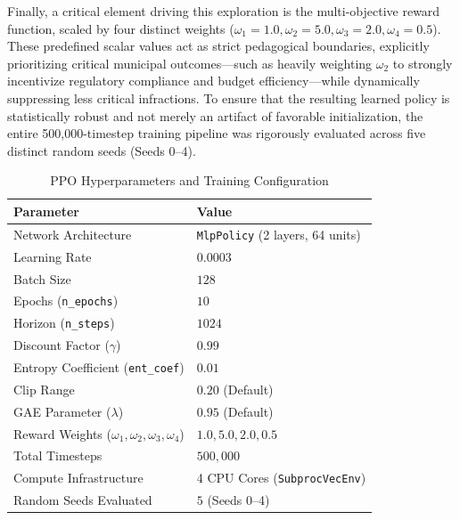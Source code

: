 Finally, a critical element driving this exploration is the multi-objective reward function, scaled by four distinct weights ($\omega_1 = 1.0, \omega_2 = 5.0, \omega_3 = 2.0, \omega_4 = 0.5$). These predefined scalar values act as strict pedagogical boundaries, explicitly prioritizing critical municipal outcomes—such as heavily weighting $\omega_2$ to strongly incentivize regulatory compliance and budget efficiency—while dynamically suppressing less critical infractions. To ensure that the resulting learned policy is statistically robust and not merely an artifact of favorable initialization, the entire 500,000-timestep training pipeline was rigorously evaluated across five distinct random seeds (Seeds 0--4).

\begin{table}[htbp]
\centering
\caption{PPO Hyperparameters and Training Configuration}
\label{tab:hyperparameters}
\begin{tabular}{l l}
\toprule
\textbf{Parameter} & \textbf{Value} \\
\midrule
Network Architecture & \texttt{MlpPolicy} (2 layers, 64 units) \\
Learning Rate & $0.0003$ \\
Batch Size & $128$ \\
Epochs (\texttt{n\_epochs}) & $10$ \\
Horizon (\texttt{n\_steps}) & $1024$ \\
Discount Factor ($\gamma$) & $0.99$ \\
Entropy Coefficient (\texttt{ent\_coef}) & $0.01$ \\
Clip Range & $0.20$ (Default) \\
GAE Parameter ($\lambda$) & $0.95$ (Default) \\
Reward Weights ($\omega_1, \omega_2, \omega_3, \omega_4$) & $1.0, 5.0, 2.0, 0.5$ \\
Total Timesteps & $500,000$ \\
Compute Infrastructure & 4 CPU Cores (\texttt{SubprocVecEnv}) \\
Random Seeds Evaluated & $5$ (Seeds 0--4) \\
\bottomrule
\end{tabular}
\end{table}